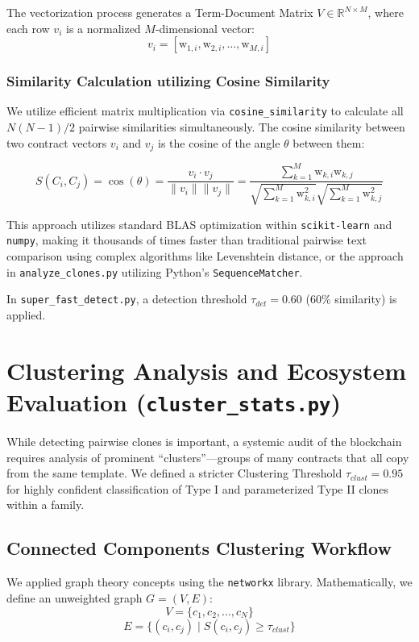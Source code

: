 \documentclass[12pt,a4paper]{article}
\begin{document}
The vectorization process generates a Term-Document Matrix $V \in \mathbb{R}^{N \times M}$, where each row $v_i$ is a normalized $M$-dimensional vector:
$$ v_i = [\text{w}_{1,i}, \text{w}_{2,i}, \dots, \text{w}_{M,i}] $$

\subsubsection{Similarity Calculation utilizing Cosine Similarity}
We utilize efficient matrix multiplication via \texttt{cosine\_similarity} to calculate all $N(N-1)/2$ pairwise similarities simultaneously. The cosine similarity between two contract vectors $v_i$ and $v_j$ is the cosine of the angle $\theta$ between them:

$$ S(C_i, C_j) = \cos(\theta) = \frac{v_i \cdot v_j}{\|v_i\| \|v_j\|} = \frac{\sum_{k=1}^M \text{w}_{k,i} \text{w}_{k,j}}{\sqrt{\sum_{k=1}^M \text{w}_{k,i}^2} \sqrt{\sum_{k=1}^M \text{w}_{k,j}^2}} $$

This approach utilizes standard BLAS optimization within \texttt{scikit-learn} and \texttt{numpy}, making it thousands of times faster than traditional pairwise text comparison using complex algorithms like Levenshtein distance, or the approach in \texttt{analyze\_clones.py} utilizing Python's \texttt{SequenceMatcher}.

In \texttt{super\_fast\_detect.py}, a detection threshold $\tau_{det} = 0.60$ (60\% similarity) is applied. 

\section{Clustering Analysis and Ecosystem Evaluation (\texttt{cluster\_stats.py})}
While detecting pairwise clones is important, a systemic audit of the blockchain requires analysis of prominent ``clusters''—groups of many contracts that all copy from the same template. We defined a stricter Clustering Threshold $\tau_{clust} = 0.95$ for highly confident classification of Type I and parameterized Type II clones within a family.

\subsection{Connected Components Clustering Workflow}
We applied graph theory concepts using the \texttt{networkx} library. Mathematically, we define an unweighted graph $G=(V, E)$:
$$ V = \{c_1, c_2, \dots, c_N\} $$
$$ E = \{(c_i, c_j) \mid S(c_i, c_j) \ge \tau_{clust} \} $$
\end{document}
